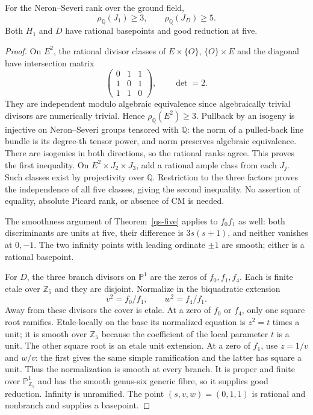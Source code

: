 \begin{lemma}\label{qh-hypotheses}
For the Neron--Severi rank over the ground field,
\[
 \rho_{\mathbb Q}(J_1)\ge3,\qquad \rho_{\mathbb Q}(J_D)\ge5.
\]
Both \(H_1\) and \(D\) have rational basepoints and good reduction at five.
\end{lemma}
\begin{proof}
On \(E^2\), the rational divisor classes of \(E\times\{O\}\),
\(\{O\}\times E\) and the diagonal have intersection matrix
\[
 \begin{pmatrix}0&1&1\\1&0&1\\1&1&0\end{pmatrix},
 \qquad\det=2.
\]
They are independent modulo algebraic equivalence since algebraically
trivial divisors are numerically trivial. Hence \(\rho_{\mathbb Q}(E^2)\ge3\).
Pullback by an isogeny is injective on Neron--Severi groups tensored with
\(\mathbb Q\): the norm of a pulled-back line bundle is its
degree-th tensor power, and norm preserves algebraic equivalence.
There are isogenies in both directions, so the rational ranks agree.
This proves the first inequality. On \(E^2\times J_2\times J_3\),
add a rational ample class from each \(J_j\). Such classes exist by
projectivity over \(\mathbb Q\). Restriction to the three factors proves
the independence of all five classes, giving the second inequality.
No assertion of equality, absolute Picard rank, or absence of CM is needed.

The smoothness argument of Theorem~\ref{qs-five} applies to \(f_0f_1\)
as well: both discriminants are units at five, their difference is
\(3s(s+1)\), and neither vanishes at \(0,-1\). The two infinity points
with leading ordinate \(\pm1\) are smooth; either is a rational basepoint.

For \(D\), the three branch divisors on \(\mathbb P^1\) are the zeros
of \(f_0,f_1,f_4\). Each is finite etale over \(\mathbb Z_5\) and
they are disjoint. Normalize in the biquadratic extension
\[
 v^2=f_0/f_1,\qquad w^2=f_4/f_1.
\]
Away from these divisors the cover is etale. At a zero of \(f_0\) or
\(f_4\), only one square root ramifies. Etale-locally on the base its
normalized equation is \(z^2=t\) times a unit; it is smooth over
\(\mathbb Z_5\) because the coefficient of the local parameter \(t\)
is a unit. The other square root is an etale unit extension. At a zero
of \(f_1\), use \(z=1/v\) and \(w/v\): the first gives the same simple
ramification and the latter has square a unit. Thus the normalization
is smooth at every branch. It is proper and finite over
\(\mathbb P^1_{\mathbb Z_5}\) and has the smooth genus-six generic fibre,
so it supplies good reduction. Infinity is unramified. The point
\((s,v,w)=(0,1,1)\) is rational and nonbranch and supplies a basepoint.
\end{proof}

